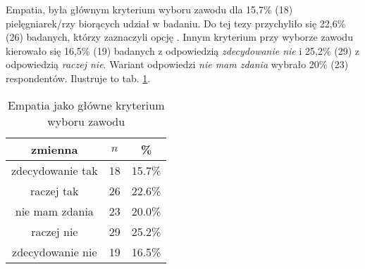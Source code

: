 
Empatia, była głównym kryterium wyboru zawodu dla 15,7\% (18) pielęgniarek/rzy biorących udział w badaniu. Do tej tezy przychyliło się 22,6\% (26) badanych, którzy zaznaczyli opcję . Innym kryterium przy wyborze zawodu kierowało się 16,5\% (19) badanych z odpowiedzią \textit{zdecydowanie nie} i 25,2\% (29) z odpowiedzią \textit{raczej nie}. Wariant odpowiedzi \textit{nie mam zdania} wybrało 20\% (23) respondentów. Ilustruje to tab. \ref{tab:Q34}.






\begin{table}[H]
\caption{Empatia jako główne kryterium wyboru zawodu}
\centering
\begin{tabular}{ | c | c | c |}
\hline
zmienna & $n$ & \% \\
\hline
zdecydowanie tak  &  18  & 15.7\% \\
\hline
raczej tak  &  26  & 22.6\% \\
\hline
nie mam zdania  &  23  & 20.0\% \\
\hline
raczej nie  &  29  & 25.2\% \\
\hline
zdecydowanie nie  &  19  & 16.5\% \\
\hline
\end{tabular}
\label{tab:Q34}
\end{table}
